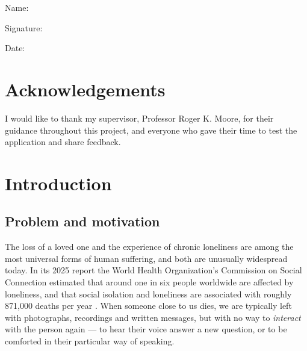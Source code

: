 \documentclass[11pt,a4paper]{report}
\begin{document}
\noindent Name: \underline{\hspace{7cm}}
\vspace{0.8cm}

\noindent Signature: \underline{\hspace{6.5cm}}
\vspace{0.8cm}

\noindent Date: \underline{\hspace{7cm}}

\chapter*{Acknowledgements}
I would like to thank my supervisor, Professor Roger K. Moore, for their guidance throughout this project, and everyone who gave their time to test the application and share feedback.

\tableofcontents
\listoffigures
\listoftables

\cleardoublepage
{}
\pagestyle{fancy}

\chapter{Introduction}
\label{ch:intro}

\section{Problem and motivation}
The loss of a loved one and the experience of chronic loneliness are among the most universal forms of human suffering, and both are unusually widespread today. In its 2025 report the World Health Organization's Commission on Social Connection estimated that around one in six people worldwide are affected by loneliness, and that social isolation and loneliness are associated with roughly 871{,}000 deaths per year \cite{who2025loneliness}. When someone close to us dies, we are typically left with photographs, recordings and written messages, but with no way to \emph{interact} with the person again --- to hear their voice answer a new question, or to be comforted in their particular way of speaking.
\end{document}
